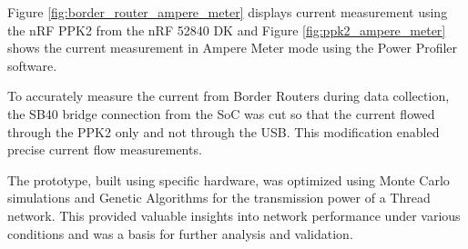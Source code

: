 Figure \ref{fig:border_router_ampere_meter} displays current measurement using the nRF PPK2 from the nRF 52840 DK and Figure \ref{fig:ppk2_ampere_meter} shows the current measurement in Ampere Meter mode using the Power Profiler software.

\vspace{2mm}
To accurately measure the current from Border Routers during data collection, the SB40 bridge connection from the SoC was cut so that the current flowed through the PPK2 only and not through the USB. This modification enabled precise current flow measurements.

The prototype, built using specific hardware, was optimized using Monte Carlo simulations and Genetic Algorithms for the transmission power of a Thread network. This provided valuable insights into network performance under various conditions and was a basis for further analysis and validation.
